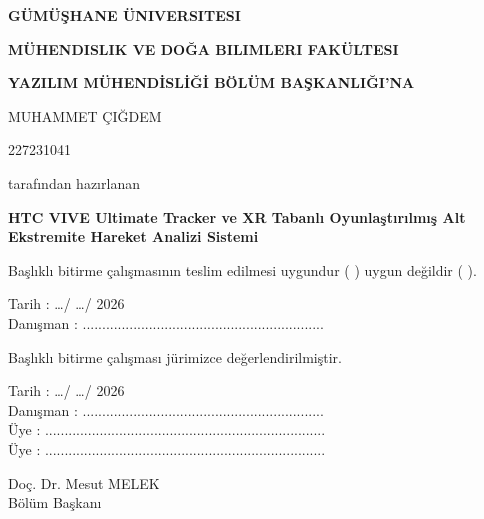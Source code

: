 \documentclass[12pt,a4paper,oneside]{report}
\newcommand{\university}{Gümüşhane Üniversitesi}
\newcommand{\faculty}{Mühendislik ve Doğa Bilimleri Fakültesi}
\newcommand{\thesistitle}{HTC VIVE Ultimate Tracker ve XR Tabanlı Oyunlaştırılmış Alt Ekstremite Hareket Analizi Sistemi}
\newcommand{\thesisauthor}{Muhammet Çiğdem}
\newcommand{\studentnumber}{227231041}
\begin{document}
\begin{titlepage}
\thispagestyle{empty}
\begin{center}
{\Large\bfseries \MakeUppercase{\university}\par}
\vspace{0.4cm}
{\large\bfseries \MakeUppercase{\faculty}\par}
\vspace{0.4cm}
{\large\bfseries YAZILIM MÜHENDİSLİĞİ BÖLÜM BAŞKANLIĞI'NA\par}
\vspace{1.2cm}
{\large \MakeUppercase{\thesisauthor}\par}
\vspace{0.3cm}
{\large \studentnumber\par}
\vspace{0.6cm}
tarafından hazırlanan
\vspace{0.6cm}

{\Large\bfseries \thesistitle\par}
\vspace{0.8cm}
Başlıklı bitirme çalışmasının teslim edilmesi uygundur ( ) uygun değildir ( ).
\vspace{0.8cm}

\begin{flushleft}
Tarih : \ldots / \ldots / 2026\\[0.8cm]
Danışman : .............................................................. \\
\end{flushleft}

\vspace{0.6cm}
Başlıklı bitirme çalışması jürimizce değerlendirilmiştir.
\vspace{0.8cm}

\begin{flushleft}
Tarih : \ldots / \ldots / 2026\\[0.8cm]
Danışman : .............................................................. \\
Üye : ........................................................................ \\
Üye : ........................................................................ \\
\end{flushleft}

\vfill
Doç. Dr. Mesut MELEK\\
Bölüm Başkanı
\end{center}
\end{titlepage}
\end{document}
